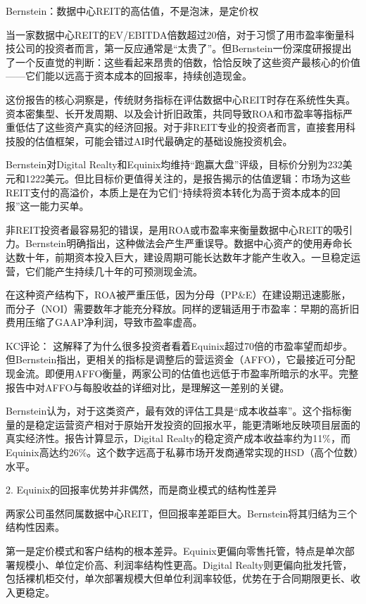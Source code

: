 \documentclass[11pt]{ctexart}
\begin{document}
Bernstein：数据中心REIT的高估值，不是泡沫，是定价权

当一家数据中心REIT的EV/EBITDA倍数超过20倍，对于习惯了用市盈率衡量科技公司的投资者而言，第一反应通常是“太贵了”。但Bernstein一份深度研报提出了一个反直觉的判断：这些看起来昂贵的倍数，恰恰反映了这些资产最核心的价值——它们能以远高于资本成本的回报率，持续创造现金。

这份报告的核心洞察是，传统财务指标在评估数据中心REIT时存在系统性失真。资本密集型、长开发周期、以及会计折旧政策，共同导致ROA和市盈率等指标严重低估了这些资产真实的经济回报。对于非REIT专业的投资者而言，直接套用科技股的估值框架，可能会错过AI时代最确定的基础设施投资机会。

Bernstein对Digital Realty和Equinix均维持“跑赢大盘”评级，目标价分别为232美元和1222美元。但比目标价更值得关注的，是报告揭示的估值逻辑：市场为这些REIT支付的高溢价，本质上是在为它们“持续将资本转化为高于资本成本的回报”这一能力买单。

非REIT投资者最容易犯的错误，是用ROA或市盈率来衡量数据中心REIT的吸引力。Bernstein明确指出，这种做法会产生严重误导。数据中心资产的使用寿命长达数十年，前期资本投入巨大，建设周期可能长达数年才能产生收入。一旦稳定运营，它们能产生持续几十年的可预测现金流。

在这种资产结构下，ROA被严重压低，因为分母（PP\&E）在建设期迅速膨胀，而分子（NOI）需要数年才能充分释放。同样的逻辑适用于市盈率：早期的高折旧费用压缩了GAAP净利润，导致市盈率虚高。

KC评论： 这解释了为什么很多投资者看着Equinix超过70倍的市盈率望而却步。但Bernstein指出，更相关的指标是调整后的营运资金（AFFO），它最接近可分配现金流。即便用AFFO衡量，两家公司的估值也远低于市盈率所暗示的水平。完整报告中对AFFO与每股收益的详细对比，是理解这一差别的关键。

Bernstein认为，对于这类资产，最有效的评估工具是“成本收益率”。这个指标衡量的是稳定运营资产相对于原始开发投资的回报水平，能更清晰地反映项目层面的真实经济性。报告计算显示，Digital Realty的稳定资产成本收益率约为11\%，而Equinix高达约26\%。这个数字远高于私募市场开发商通常实现的HSD（高个位数）水平。

2. Equinix的回报率优势并非偶然，而是商业模式的结构性差异

两家公司虽然同属数据中心REIT，但回报率差距巨大。Bernstein将其归结为三个结构性因素。

第一是定价模式和客户结构的根本差异。Equinix更偏向零售托管，特点是单次部署规模小、单位定价高、利润率结构性更高。Digital Realty则更偏向批发托管，包括裸机柜交付，单次部署规模大但单位利润率较低，优势在于合同期限更长、收入更稳定。
\end{document}
